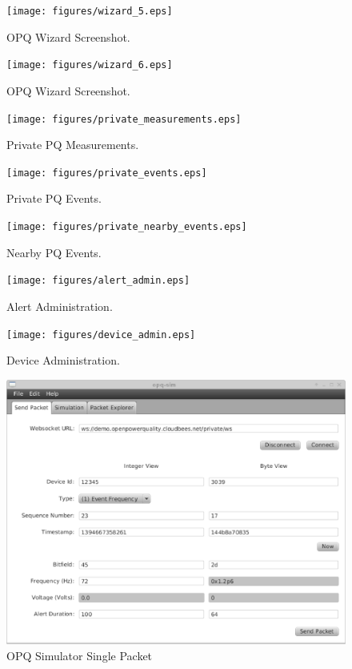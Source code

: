 \begin{figure}[htbp]
	\centering
	\texttt{[image: figures/wizard\_5.eps]}
	\caption{OPQ Wizard Screenshot.}
	\label{fig:wizard_5}
\end{figure}

\begin{figure}[htbp]
	\centering
	\texttt{[image: figures/wizard\_6.eps]}
	\caption{OPQ Wizard Screenshot.}
	\label{fig:wizard_6}
\end{figure}

\begin{figure}[htbp]
	\centering
	\texttt{[image: figures/private\_measurements.eps]}
	\caption{Private PQ Measurements.}
	\label{fig:private_measurements}
\end{figure}

\begin{figure}[htbp]
	\centering
	\texttt{[image: figures/private\_events.eps]}
	\caption{Private PQ Events.}
	\label{fig:private_events}
\end{figure}

\begin{figure}[htbp]
	\centering
	\texttt{[image: figures/private\_nearby\_events.eps]}
	\caption{Nearby PQ Events.}
	\label{fig:nearby_events}
\end{figure}

\begin{figure}[htbp]
	\centering
	\texttt{[image: figures/alert\_admin.eps]}
	\caption{Alert Administration.}
	\label{fig:alert_admin}
\end{figure}

\begin{figure}[htbp]
	\centering
	\texttt{[image: figures/device\_admin.eps]}
	\caption{Device Administration.}
	\label{fig:device_admin}
\end{figure}

\begin{figure}[htbp]
	\centering
	\includegraphics[width=\textwidth]{figures/sim_single_packet.eps}
	\caption{OPQ Simulator Single Packet}
	\label{fig:sim_single}
\end{figure}

